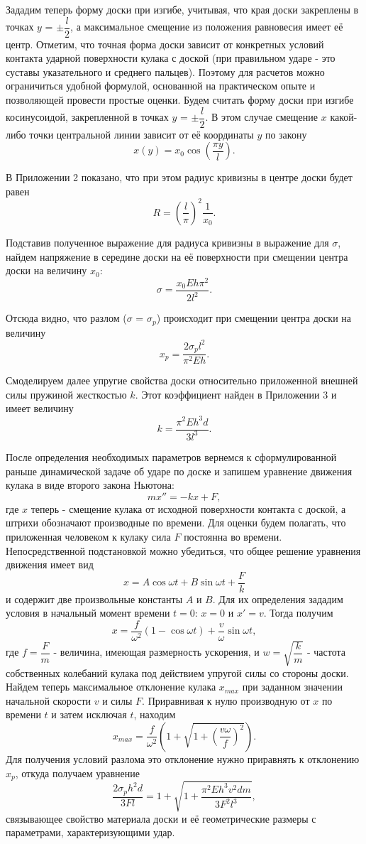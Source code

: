 \documentclass[a4paper,12pt]{article} %
\begin{document}
Зададим теперь форму доски при изгибе, учитывая, что края доски закреплены в точках $y$ = $\pm \dfrac{l}{2}$, а максимальное смещение из положения равновесия имеет её центр. Отметим, что точная форма доски зависит от конкретных условий контакта ударной поверхности кулака с доской (при правильном ударе - это суставы указательного и среднего пальцев). Поэтому для расчетов можно ограничиться удобной формулой, основанной на практическом опыте и позволяющей провести простые оценки. Будем считать форму доски при изгибе косинусоидой, закрепленной в точках $y$ = $\pm \dfrac{l}{2}$. В этом случае смещение $x$ какой-либо точки центральной линии зависит от её координаты $y$ по закону $$x(y) = x_0 \cos{\left(\dfrac{\pi y}{l}\right)}.$$

В Приложении 2 показано, что при этом радиус кривизны в центре доски будет равен $$R = \left(\dfrac{l}{\pi}\right)^2 \dfrac{1}{x_0}.$$

Подставив полученное выражение для радиуса кривизны в выражение для $\sigma$, найдем напряжение в середине доски на её поверхности при смещении центра доски на величину $x_0$: $$\sigma = \dfrac{x_0Eh\pi^2}{2l^2}.$$

Отсюда видно, что разлом ($\sigma$ = $\sigma_p$) происходит при смещении центра доски на величину $$x_p = \dfrac{2\sigma_pl^2}{\pi^2Eh}.$$

Смоделируем далее упругие свойства доски относительно приложенной внешней силы пружиной жесткостью $k$. Этот коэффициент найден в Приложении 3 и имеет величину $$k = \dfrac{\pi^2Eh^3d}{3l^3}.$$

После определения необходимых параметров вернемся к сформулированной раньше динамической задаче об ударе по доске и запишем уравнение движения кулака в виде второго закона Ньютона: $$mx'' = -kx + F,$$ где $x$ теперь - смещение кулака от исходной поверхности контакта с доской, а штрихи обозначают производные по времени. Для оценки будем полагать, что приложенная человеком к кулаку сила $F$ постоянна во времени. Непосредственной подстановкой можно убедиться, что общее решение уравнения движения имеет вид $$x = A\cos{\omega t} + B\sin{\omega t} + \dfrac{F}{k}$$ и содержит две произвольные константы $A$ и $B$. Для их определения зададим условия в начальный момент времени $t = 0$: $x = 0$ и $x' = v$. Тогда получим $$x = \dfrac{f}{\omega^2}(1 - \cos{\omega t}) + \dfrac{v}{\omega}\sin{\omega t},$$ где $f = \dfrac{F}{m}$ - величина, имеющая размерность ускорения, и $w = \sqrt{\dfrac{k}{m}}$ - частота собственных колебаний кулака под действием упругой силы со стороны доски. Найдем теперь максимальное отклонение кулака $x_{max}$ при заданном значении начальной скорости $v$ и силы $F$. Приравнивая к нулю производную от $x$ по времени $t$ и затем исключая $t$, находим $$x_{max} = \dfrac{f}{\omega^2}\left(1 + \sqrt{1 + \left(\dfrac{v\omega}{f}\right)^2}\right).$$ Для получения условий разлома это отклонение нужно приравнять к отклонению $x_p$, откуда получаем уравнение $$\dfrac{2\sigma_ph^2d}{3Fl} = 1 + \sqrt{1 + \dfrac{\pi^2Eh^3v^2dm}{3F^2l^3}},$$ связывающее свойство материала доски и её геометрические размеры с параметрами, характеризующими удар.
\end{document}
